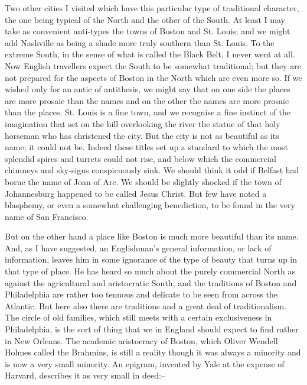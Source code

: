 \documentclass{book}
\begin{document}
Two other cities I visited which have this particular type of traditional character, the one being typical of the North and the other of the South. At least I may take as convenient anti-types the towns of Boston and St. Louis; and we might add Nashville as being a shade more truly southern than St. Louis. To the extreme South, in the sense of what is called the Black Belt, I never went at all. Now English travellers expect the South to be somewhat traditional; but they are not prepared for the aspects of Boston in the North which are even more so. If we wished only for an antic of antithesis, we might say that on one side the places are more prosaic than the names and on the other the names are more prosaic than the places. St. Louis is a fine town, and we recognise a fine instinct of the imagination that set on the hill overlooking the river the statue of that holy horseman who has christened the city. But the city is not as beautiful as its name; it could not be. Indeed these titles set up a standard to which the most splendid spires and turrets could not rise, and below which the commercial chimneys and sky-signs conspicuously sink. We should think it odd if Belfast had borne the name of Joan of Arc. We should be slightly shocked if the town of Johannesburg happened to be called Jesus Christ. But few have noted a blasphemy, or even a somewhat challenging benediction, to be found in the very name of San Francisco.

But on the other hand a place like Boston is much more beautiful than its name. And, as I have suggested, an Englishman’s general information, or lack of information, leaves him in some ignorance of the type of beauty that turns up in that type of place. He has heard so much about the purely commercial North as against the agricultural and aristocratic South, and the traditions of Boston and Philadelphia are rather too tenuous and delicate to be seen from across the Atlantic. But here also there are traditions and a great deal of traditionalism. The circle of old families, which still meets with a certain exclusiveness in Philadelphia, is the sort of thing that we in England should expect to find rather in New Orleans. The academic aristocracy of Boston, which Oliver Wendell Holmes called the Brahmins, is still a reality though it was always a minority and is now a very small minority. An epigram, invented by Yale at the expense of Harvard, describes it as very small in deed:–
\end{document}
